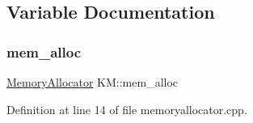 \subsection{Variable Documentation}
\mbox{\label{namespace_k_m_ab71afb37d9950edf604f583b657905aa}} 
\subsubsection{\texorpdfstring{mem\+\_\+alloc}{mem\_alloc}}
{\footnotesize\ttfamily \hyperlink{class_k_m_1_1_memory_allocator}{Memory\+Allocator} K\+M\+::mem\+\_\+alloc}



Definition at line 14 of file memoryallocator.\+cpp.

